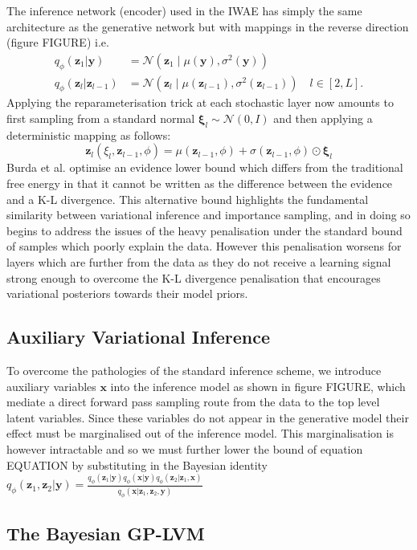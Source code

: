\documentclass[]{article}
\newcommand{\xb}{\mathbf{x}}
\newcommand{\zb}{\mathbf{z}}
\newcommand{\yb}{\mathbf{y}}
\newcommand{\No}{\mathcal{N}}
\begin{document}
The inference network (encoder) used in the IWAE has simply the same architecture as the generative network but with mappings in the reverse direction (figure FIGURE) i.e.
%
\begin{align}
  q_\phi(\zb_1|\yb) &= \No(\zb_1\mid \mu(\yb), \sigma^2(\yb)) \\
  q_\phi(\zb_l|\zb_{l-1}) &= \No(\zb_l\mid \mu(\zb_{l-1}), \sigma^2(\zb_{l-1}))\quad l\in[2,L].
\end{align}
%
Applying the reparameterisation trick at each stochastic layer now amounts to first sampling from a standard normal $\boldsymbol{\xi}_l\sim\No(0,I)$ and then applying a deterministic mapping as follows:
%
\begin{equation}
  \zb_l(\xi_l,\zb_{l-1},\phi) = \mu(\zb_{l-1},\phi) + \sigma(\zb_{l-1},\phi)\odot\boldsymbol{\xi}_l
\end{equation}
%
Burda et al. optimise an evidence lower bound which differs from the traditional free energy in that it cannot be written as the difference between the evidence and a K-L divergence. This alternative bound highlights the fundamental similarity between variational inference and importance sampling, and in doing so begins to address the issues of the heavy penalisation under the standard bound of samples which poorly explain the data. However this penalisation worsens for layers which are further from the data as they do not receive a learning signal strong enough to overcome the K-L divergence penalisation that encourages variational posteriors towards their model priors.
%
\subsection{Auxiliary Variational Inference}\label{subsec:aux}

To overcome the pathologies of the standard inference scheme, we introduce auxiliary variables $\xb$ into the inference model as shown in figure FIGURE, which mediate a direct forward pass sampling route from the data to the top level latent variables. Since these variables do not appear in the generative model their effect must be marginalised out of the inference model. This marginalisation is however intractable and so we must further lower the bound of equation EQUATION by substituting in the Bayesian identity $q_\phi(\zb_1,\zb_2|\yb) = \frac{q_\phi(\zb_1|\yb)q_\phi(\xb|\yb)q_\phi(\zb_2|\zb_1,\xb)}{q_\phi(\xb|\zb_1,\zb_2,\yb)}$
%
\subsection{The Bayesian GP-LVM}\label{subsec:gplvm}
\end{document}
